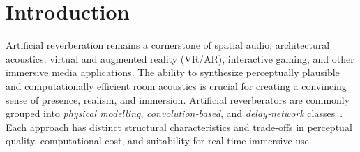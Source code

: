\documentclass[journal]{IEEEtran}
\begin{document}
\section{Introduction}\label{sec:intro}
Artificial reverberation remains a cornerstone of spatial audio, architectural acoustics, virtual and augmented reality (VR/AR), interactive gaming, and other immersive media applications. 
The ability to synthesize perceptually plausible and computationally efficient room acoustics is crucial for creating a convincing sense of presence, realism, and immersion. 
Artificial reverberators are commonly grouped into \emph{physical modelling}, \emph{convolution‐based}, and \emph{delay‐network} classes~\cite{valimakiFiftyYearsArtificial2012}. Each approach has distinct structural characteristics and trade-offs in perceptual quality, computational cost, and suitability for real-time immersive use.\\
\end{document}
